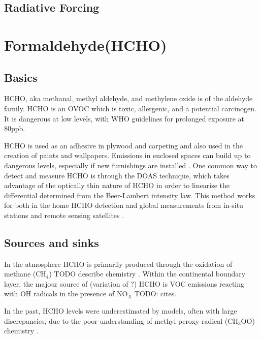   \subsection{Radiative Forcing}

  
\section{Formaldehyde(HCHO)}
\label{ch1:sec:formaldehyde}
  
  \subsection{Basics}
    HCHO, aka methanal, methyl aldehyde, and methylene oxide is of the aldehyde family.
    HCHO is an OVOC which is toxic, allergenic, and a potential carcinogen. 
    It is dangerous at low levels, with WHO guidelines for prolonged exposure at 80ppb.
    
    HCHO is used as an adhesive in plywood and carpeting and also used in the creation of paints and wallpapers.
    Emissions in enclosed spaces can build up to dangerous levels, especially if new furnishings are installed \citep{Davenport2015}.
    One common way to detect and measure HCHO is through the DOAS technique, which takes advantage of the optically thin nature of HCHO in order to linearise the differential determined from the Beer-Lambert intensity law.
    This method works for both in the home HCHO detection and global measurements from in-situ stations and remote sensing satellites \citep{Guenther1995, Abad2015,Davenport2015}.
    
  \subsection{Sources and sinks}
    In the atmosphere HCHO is primarily produced through the oxidation of methane (CH$_4$) TODO describe chemistry \citep{Wagner2002, Millet2006}.
    Within the continental boundary layer, the majour source of (variation of ?) HCHO is VOC emissions reacting with OH radicals in the presence of NO$_X$ TODO: cites.
    
    In the past, HCHO levels were underestimated by models, often with large discrepancies, due to the poor understanding of methyl peroxy radical (CH$_3$OO) chemistry \citep{Wagner2002}.
    
